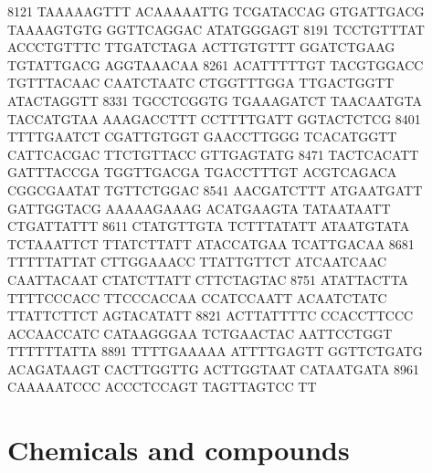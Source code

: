\begin{addmargin}{0.025\textwidth}
\begin{footnotesize}
\begin{LVerbatim}[commandchars=\\\{\}]
\color{red}8121 TAAAAAGTTT ACAAAAATTG TCGATACCAG GTGATTGACG TAAAAGTGTG GGTTCAGGAC ATATGGGAGT
\color{red}8191 TCCTGTTTAT ACCCTGTTTC TTGATCTAGA ACTTGTGTTT GGATCTGAAG TGTATTGACG AGGTAAACAA
\color{red}8261 ACATTTTTGT TACGTGGACC TGTTTACAAC CAATCTAATC CTGGTTTGGA TTGACTGGTT ATACTAGGTT
\color{red}8331 TGCCTCGGTG TGAAAGATCT TAACAATGTA TACCATGTAA AAAGACCTTT CCTTTTGATT GGTACTCTCG
\color{red}8401 TTTTGAATCT CGATTGTGGT GAACCTTGGG TCACATGGTT CATTCACGAC TTCTGTTACC GTTGAGTATG
\color{red}8471 TACTCACATT GATTTACCGA TGGTTGACGA TGACCTTTGT ACGTCAGACA CGGCGAATAT TGTTCTGGAC
\color{red}8541 AACGATCTTT ATGAATGATT GATTGGTACG AAAAAGAAAG ACATGAAGTA TATAATAATT CTGATTATTT
\color{red}8611 CTATGTTGTA TCTTTATATT ATAATGTATA TCTAAATTCT TTATCTTATT ATACCATGAA TCATTGACAA
\color{red}8681 TTTTTATTAT CTTGGAAACC TTATTGTTCT ATCAATCAAC CAATTACAAT CTATCTTATT CTTCTAGTAC
\color{red}8751 ATATTACTTA TTTTCCCACC TTCCCACCAA CCATCCAATT ACAATCTATC TTATTCTTCT AGTACATATT
\color{red}8821 ACTTATTTTC CCACCTTCCC ACCAACCATC CATAAGGGAA TCTGAACTAC AATTCCTGGT TTTTTTATTA
\color{red}8891 TTTTGAAAAA ATTTTGAGTT GGTTCTGATG ACAGATAAGT CACTTGGTTG ACTTGGTAAT CATAATGATA
\color{red}8961 CAAAAATCCC ACCCT\color{black}CCAGT TAGTTAGTCC TT 
\end{LVerbatim}
\end{footnotesize}

\end{addmargin}

\newpage




\section{Chemicals and compounds}

